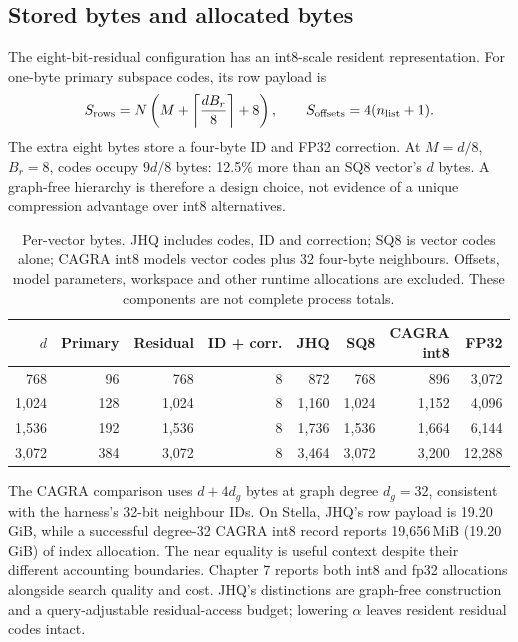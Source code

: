 \subsection{Stored bytes and allocated bytes}

The eight-bit-residual configuration has an int8-scale resident
representation. For one-byte primary subspace codes, its row payload is
\begin{equation}
 S_{\rm rows}=N\left(M+\left\lceil\frac{dB_r}{8}\right\rceil+8\right),
 \qquad S_{\rm offsets}=4(n_{\rm list}+1).
 \label{eq:4-row-storage}
\end{equation}
The extra eight bytes store a four-byte ID and FP32 correction. At
$M=d/8$, $B_r=8$, codes occupy $9d/8$ bytes: 12.5\% more than an SQ8
vector's $d$ bytes. A graph-free hierarchy is therefore a design choice,
not evidence of a unique compression advantage over int8 alternatives.

\begin{table}[tbp]
\centering
\caption[Per-vector storage model]{Per-vector bytes. JHQ includes codes, ID and correction; SQ8 is
vector codes alone; CAGRA int8 models vector codes plus 32 four-byte
neighbours. Offsets, model parameters, workspace and other runtime
allocations are excluded. These components are not complete process totals.}
\label{tab:4-bytes}
\footnotesize\setlength{\tabcolsep}{4pt}
\begin{tabular}{@{}rrrrrrrr@{}}
\toprule
$d$ & Primary & Residual & ID + corr. & JHQ & SQ8 & \shortstack{CAGRA\\int8} & FP32 \\
\midrule
768 & 96 & 768 & 8 & 872 & 768 & 896 & 3,072 \\
1,024 & 128 & 1,024 & 8 & 1,160 & 1,024 & 1,152 & 4,096 \\
1,536 & 192 & 1,536 & 8 & 1,736 & 1,536 & 1,664 & 6,144 \\
3,072 & 384 & 3,072 & 8 & 3,464 & 3,072 & 3,200 & 12,288 \\
\bottomrule
\end{tabular}
\end{table}

The CAGRA comparison uses $d+4d_g$ bytes at graph degree $d_g=32$,
consistent with the harness's 32-bit neighbour IDs. On Stella, JHQ's row
payload is 19.20\,GiB, while a successful degree-32 CAGRA int8 record
reports 19,656\,MiB (19.20\,GiB) of index allocation. The near equality is
useful context despite their different accounting boundaries. Chapter 7
reports both int8 and fp32 allocations alongside search quality and cost.
JHQ's distinctions are graph-free construction and a query-adjustable
residual-access budget; lowering $\alpha$ leaves resident residual codes
intact.

